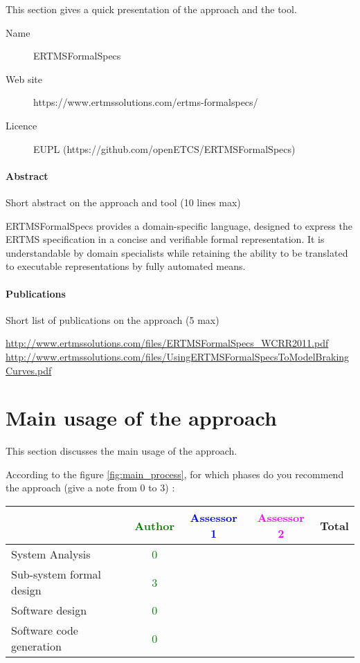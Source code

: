 This section gives a quick presentation of the approach and the tool.

\begin{description}
\item[Name] ERTMSFormalSpecs
\item[Web site] https://www.ertmssolutions.com/ertms-formalspecs/
\item[Licence] EUPL (https://github.com/openETCS/ERTMSFormalSpecs)
\end{description}

\paragraph{Abstract} Short abstract on the approach and tool (10 lines max)

ERTMSFormalSpecs provides a domain-specific language, designed to express the ERTMS specification in a concise and verifiable formal representation. It is understandable by domain specialists while retaining the ability to be translated to executable representations by fully automated means.
\paragraph{Publications} Short list of publications on the approach (5 max)

\url{http://www.ertmssolutions.com/files/ERTMSFormalSpecs\_WCRR2011.pdf   }
\url{http://www.ertmssolutions.com/files/UsingERTMSFormalSpecsToModelBrakingCurves.pdf}

\section{Main usage of the approach}
\label{main_usage}
This section discusses the main usage of the approach.

According to the figure \ref{fig:main_process}, for which phases do you recommend the approach (give a note from 0 to  3) :

\begin{tabular}{|l | c | c | c | c|}
\hline
& \textcolor{green}{Author} & \textcolor{blue}{Assessor 1} & \textcolor{magenta}{Assessor 2} & Total \\
\hline 
System Analysis & \textcolor{green}{0} & & &  \\
\hline
Sub-system formal design & \textcolor{green}{3} & & & \\
\hline
Software design & \textcolor{green}{0} & & & \\
\hline
Software code generation & \textcolor{green}{0} & & & \\
\hline
\end{tabular}

